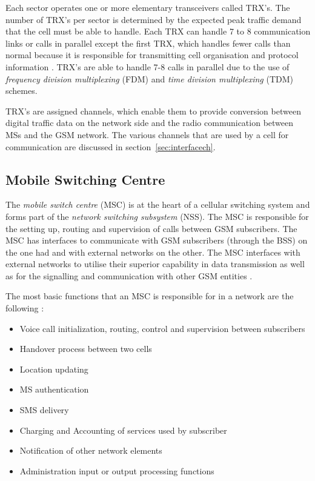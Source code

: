 Each sector operates one or more elementary transceivers called TRX’s. The number of TRX’s per sector is determined by the expected peak traffic demand that the cell must be able to handle. Each TRX can handle 7 to 8 communication links or calls in parallel except the first TRX, which handles fewer calls than normal because it is responsible for transmitting cell organisation and protocol information \cite{Eisenblatter}. TRX’s are able to handle 7-8 calls in parallel due to the use of \emph{frequency division multiplexing} (FDM) and \emph{time division multiplexing} (TDM) schemes. 

TRX’s are assigned channels, which enable them to provide conversion between digital traffic data on the network side and the radio communication between MSs and the GSM network\cite{ACOvsEA,FAPOrientationModel}. The various channels that are used by a cell for communication are discussed in section~\ref{sec:interfacech}.

\subsection{Mobile Switching Centre}

The \emph{mobile switch centre} (MSC) is at the heart of a cellular switching system and forms part of the \emph{network switching subsystem} (NSS). The MSC is responsible for the setting up, routing and supervision of calls between GSM subscribers\cite{GSM92,GSMSysEngin}. The MSC has interfaces to communicate with GSM subscribers (through the BSS) on the one had and with external networks on the other\cite{GSM92}. The MSC interfaces with external networks to utilise their superior capability in data transmission as well as for the signalling and communication with other GSM entities \cite{GSM92}. 

The most basic functions that an MSC is responsible for in a network are the following \cite{wirelesstelcoMullet}:
\begin{itemize}
\item Voice call initialization, routing, control and supervision between subscribers
\item Handover process between two cells
\item Location updating
\item MS authentication
\item SMS delivery
\item Charging and Accounting of services used by subscriber
\item Notification of other network elements
\item Administration input or output processing functions
\end{itemize}

